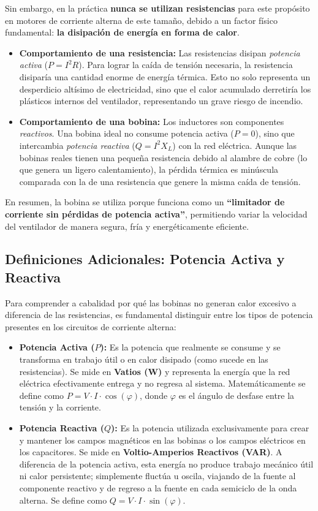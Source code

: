 \documentclass[12pt, a4paper]{article}
\begin{document}
Sin embargo, en la práctica \textbf{nunca se utilizan resistencias} para este propósito en motores de corriente alterna de este tamaño, debido a un factor físico fundamental: \textbf{la disipación de energía en forma de calor}.

\begin{itemize}
    \item \textbf{Comportamiento de una resistencia:} Las resistencias disipan \textit{potencia activa} ($P = I^2 R$). Para lograr la caída de tensión necesaria, la resistencia disiparía una cantidad enorme de energía térmica. Esto no solo representa un desperdicio altísimo de electricidad, sino que el calor acumulado derretiría los plásticos internos del ventilador, representando un grave riesgo de incendio.
    \item \textbf{Comportamiento de una bobina:} Los inductores son componentes \textit{reactivos}. Una bobina ideal no consume potencia activa ($P = 0$), sino que intercambia \textit{potencia reactiva} ($Q = I^2 X_L$) con la red eléctrica. Aunque las bobinas reales tienen una pequeña resistencia debido al alambre de cobre (lo que genera un ligero calentamiento), la pérdida térmica es minúscula comparada con la de una resistencia que genere la misma caída de tensión.
\end{itemize}

En resumen, la bobina se utiliza porque funciona como un \textbf{``limitador de corriente sin pérdidas de potencia activa''}, permitiendo variar la velocidad del ventilador de manera segura, fría y energéticamente eficiente.

\subsection*{Definiciones Adicionales: Potencia Activa y Reactiva}
Para comprender a cabalidad por qué las bobinas no generan calor excesivo a diferencia de las resistencias, es fundamental distinguir entre los tipos de potencia presentes en los circuitos de corriente alterna:

\begin{itemize}
    \item \textbf{Potencia Activa ($P$):} Es la potencia que realmente se consume y se transforma en trabajo útil o en calor disipado (como sucede en las resistencias). Se mide en \textbf{Vatios (W)} y representa la energía que la red eléctrica efectivamente entrega y no regresa al sistema. Matemáticamente se define como $P = V \cdot I \cdot \cos(\varphi)$, donde $\varphi$ es el ángulo de desfase entre la tensión y la corriente.
    
    \item \textbf{Potencia Reactiva ($Q$):} Es la potencia utilizada exclusivamente para crear y mantener los campos magnéticos en las bobinas o los campos eléctricos en los capacitores. Se mide en \textbf{Voltio-Amperios Reactivos (VAR)}. A diferencia de la potencia activa, esta energía no produce trabajo mecánico útil ni calor persistente; simplemente fluctúa u oscila, viajando de la fuente al componente reactivo y de regreso a la fuente en cada semiciclo de la onda alterna. Se define como $Q = V \cdot I \cdot \sin(\varphi)$.
\end{itemize}
\end{document}
